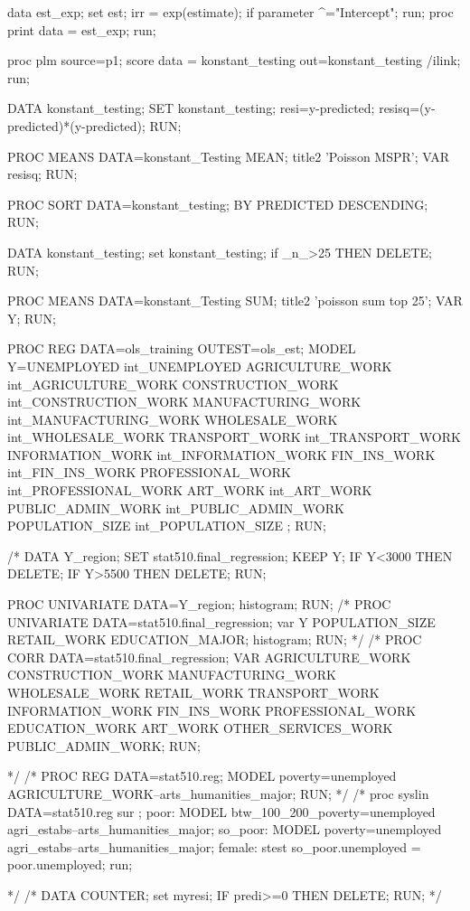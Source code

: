 \begin{SAScode}
data est_exp;
  set est;
  irr = exp(estimate);
  if parameter ^="Intercept";
run;
proc print data = est_exp;
run;

proc plm source=p1;
  score data = konstant_testing out=konstant_testing /ilink;
run;

DATA konstant_testing;
SET konstant_testing;
resi=y-predicted;
resisq=(y-predicted)*(y-predicted);
RUN;

PROC MEANS DATA=konstant_Testing MEAN;
title2 'Poisson MSPR';
VAR resisq;
RUN;

PROC SORT DATA=konstant_testing;
BY PREDICTED DESCENDING;
RUN;

DATA konstant_testing;
set konstant_testing;
if _n_>25 THEN DELETE;
RUN;

PROC MEANS DATA=konstant_Testing SUM;
title2 'poisson sum top 25';
VAR Y;
RUN;



PROC REG DATA=ols_training OUTEST=ols_est;
MODEL Y=UNEMPLOYED int_UNEMPLOYED
AGRICULTURE_WORK int_AGRICULTURE_WORK
CONSTRUCTION_WORK int_CONSTRUCTION_WORK
MANUFACTURING_WORK int_MANUFACTURING_WORK
WHOLESALE_WORK int_WHOLESALE_WORK
TRANSPORT_WORK int_TRANSPORT_WORK
INFORMATION_WORK int_INFORMATION_WORK
FIN_INS_WORK int_FIN_INS_WORK
PROFESSIONAL_WORK int_PROFESSIONAL_WORK
ART_WORK int_ART_WORK
PUBLIC_ADMIN_WORK int_PUBLIC_ADMIN_WORK
POPULATION_SIZE int_POPULATION_SIZE
;
RUN;


/*
DATA Y_region;
SET stat510.final_regression;
KEEP Y;
IF Y<3000 THEN DELETE;
IF Y>5500 THEN DELETE;
RUN;

PROC UNIVARIATE DATA=Y_region;
histogram;
RUN;
/*
PROC UNIVARIATE DATA=stat510.final_regression;
var Y POPULATION_SIZE RETAIL_WORK EDUCATION_MAJOR;
histogram;
RUN;
*/
/*
PROC CORR DATA=stat510.final_regression;
VAR AGRICULTURE_WORK
	CONSTRUCTION_WORK
	MANUFACTURING_WORK
	WHOLESALE_WORK
	RETAIL_WORK
	TRANSPORT_WORK
	INFORMATION_WORK
	FIN_INS_WORK
	PROFESSIONAL_WORK
	EDUCATION_WORK
	ART_WORK
	OTHER_SERVICES_WORK
	PUBLIC_ADMIN_WORK;
	RUN;
	
*/
/*
PROC REG DATA=stat510.reg;
MODEL poverty=unemployed AGRICULTURE_WORK--arts_humanities_major;
RUN;
*/
/*
proc syslin DATA=stat510.reg sur ;
  poor:  MODEL btw_100_200_poverty=unemployed agri_estabs--arts_humanities_major;
  so_poor:    MODEL poverty=unemployed agri_estabs--arts_humanities_major;
  female: stest so_poor.unemployed = poor.unemployed;
run;

*/
/*
DATA COUNTER;
set myresi;
IF predi>=0 THEN DELETE;
RUN;
*/




\end{SAScode}
